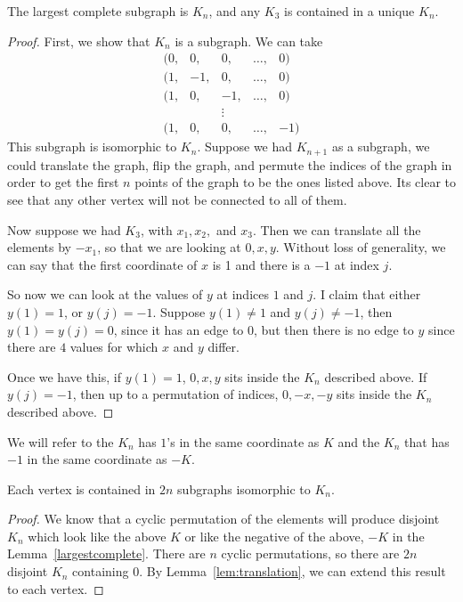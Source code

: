 \documentclass[runningheads,a4paper]{llncs}
\begin{document}
\begin{lemma}
\label{lem:largestcomplete}
The largest complete subgraph is $K_n$, and any $K_3$ is contained in a unique $K_n$.
\end{lemma}

\begin{proof}
First, we show that $K_n$ is a subgraph. We can take 
\[ \begin{array}{ccccc} (0, &0, &0, &\dots, &0) \\
			     (1, &-1, &0, &\dots, &0) \\
			     (1, &0, &-1, &\dots, &0) \\
				&&\vdots \\
			     (1, &0, &0, &\dots, &-1) \end{array} \]
This subgraph is isomorphic to $K_n$. Suppose we had $K_{n+1}$ as a subgraph, we could translate the graph, flip the graph, and permute the indices of the graph in order to get the first $n$ points of the graph to be the ones listed above. Its clear to see that any other vertex will not be connected to all of them.

Now suppose we had $K_3$, with $x_1, x_2,$ and $x_3$. Then we can translate all the elements by $-x_1$, so that we are looking at $0, x, y$. Without loss of generality, we can say that the first coordinate of $x$ is 1 and there is a $-1$ at index $j$. 

So now we can look at the values of $y$ at indices $1$ and $j$. I claim that either $y(1) = 1$, or $y(j) = -1$. Suppose $y(1) \neq 1$ and $y(j) \neq -1$, then $y(1) = y(j) = 0$, since it has an edge to $0$, but then there is no edge to $y$ since there are $4$ values for which $x$ and $y$ differ. 

Once we have this, if $y(1) = 1$, $0,x, y$ sits inside the $K_n$ described above. If $y(j) = -1$, then up to a permutation of indices, $0, -x, -y$ sits inside the $K_n$ described above.
\end{proof}

We will refer to the $K_n$ has $1$'s in the same coordinate as $K$ and the $K_n$ that has $-1$ in the same coordinate as $-K$. 

\begin{lemma}
Each vertex is contained in $2n$ subgraphs isomorphic to $K_n$. 
\end{lemma}

\begin{proof}
We know that a cyclic permutation of the elements will produce disjoint $K_n$ which look like the above $K$ or like the negative of the above,  $-K$ in the Lemma~\ref{largestcomplete}. There are $n$ cyclic permutations, so there are $2n$ disjoint $K_n$ containing $0$. By Lemma~\ref{lem:translation}, we can extend this result to each vertex.
\end{proof}
\end{document}

